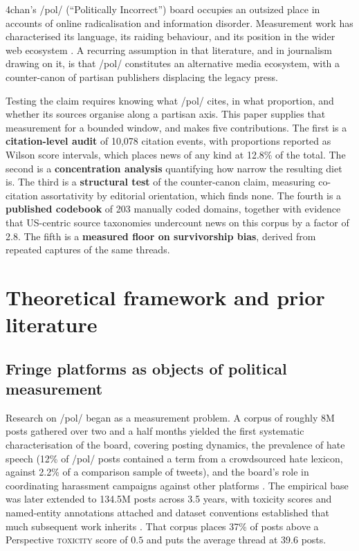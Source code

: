 \documentclass[11pt]{article}
\begin{document}
4chan's /pol/ (``Politically Incorrect'') board occupies an outsized place in
accounts of online radicalisation and information disorder. Measurement work has
characterised its language, its raiding behaviour, and its position in the wider
web ecosystem \citep{hine2017,papasavva2020}. A recurring assumption in that
literature, and in journalism drawing on it, is that /pol/ constitutes an
alternative media ecosystem, with a counter-canon of partisan publishers
displacing the legacy press.

Testing the claim requires knowing what /pol/ cites, in what proportion, and
whether its sources organise along a partisan axis. This paper supplies that
measurement for a bounded window, and makes five contributions. The first is a
\textbf{citation-level audit} of 10{,}078 citation events, with proportions
reported as Wilson score intervals, which places news of any kind at 12.8\% of
the total. The second is a \textbf{concentration analysis} quantifying how
narrow the resulting diet is. The third is a \textbf{structural test} of the
counter-canon claim, measuring co-citation assortativity by editorial
orientation, which finds none. The fourth is a \textbf{published codebook} of
203 manually coded domains, together with evidence that US-centric source
taxonomies undercount news on this corpus by a factor of 2.8. The fifth is a
\textbf{measured floor on survivorship bias}, derived from repeated captures of
the same threads.

\section{Theoretical framework and prior literature}
\label{sec:theory}

\subsection{Fringe platforms as objects of political measurement}

Research on /pol/ began as a measurement problem. A corpus of roughly 8M posts
gathered over two and a half months yielded the first systematic
characterisation of the board, covering posting dynamics, the prevalence of hate
speech (12\% of /pol/ posts contained a term from a crowdsourced hate lexicon,
against 2.2\% of a comparison sample of tweets), and the board's role in
coordinating harassment campaigns against other platforms \citep{hine2017}. The
empirical base was later extended to 134.5M posts across 3.5 years, with
toxicity scores and named-entity annotations attached and dataset conventions
established that much subsequent work inherits \citep{papasavva2020}. That
corpus places 37\% of posts above a Perspective \textsc{toxicity} score of $0.5$
and puts the average thread at 39.6 posts.
\end{document}
